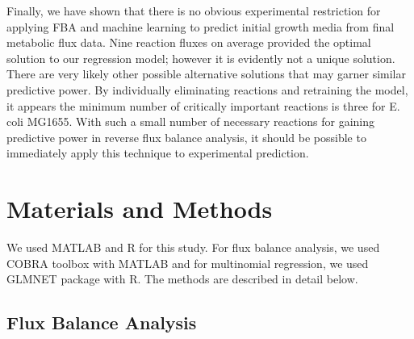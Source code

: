 \documentclass[12pt]{article}
\begin{document}
Finally, we have shown that there is no obvious experimental restriction for applying FBA and machine learning to predict initial growth media from final metabolic flux data. Nine reaction fluxes on average provided the optimal solution to our regression model; however it is evidently not a unique solution. There are very likely other possible alternative solutions that may garner similar predictive power. By individually eliminating reactions and retraining the model, it appears the minimum number of critically important reactions is three for E. coli MG1655.  With such a small number of necessary reactions for gaining predictive power in reverse flux balance analysis, it should be possible to immediately apply this technique to experimental prediction. 

\section*{Materials and Methods}
We used MATLAB and R for this study. For flux balance analysis, we used COBRA toolbox \cite{Schellenbergeretal2011} with MATLAB and for multinomial regression, we used GLMNET package \cite{Friedmanetal2010} with R. The methods are described in detail below.

\subsection*{Flux Balance Analysis} 
\end{document}
